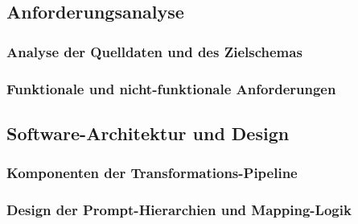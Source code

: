
\subsection{Anforderungsanalyse}

\subsubsection{Analyse der Quelldaten und des Zielschemas}

\subsubsection{Funktionale und nicht-funktionale Anforderungen}

\subsection{Software-Architektur und Design}

\subsubsection{Komponenten der Transformations-Pipeline}

\subsubsection{Design der Prompt-Hierarchien und Mapping-Logik}